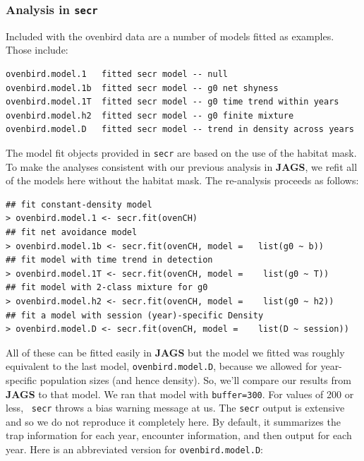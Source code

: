 \subsubsection{Analysis in \mbox{\tt secr} }


Included with the ovenbird data are a number of  models fitted as
examples. Those include:
{\small
\begin{verbatim}
ovenbird.model.1   fitted secr model -- null
ovenbird.model.1b  fitted secr model -- g0 net shyness
ovenbird.model.1T  fitted secr model -- g0 time trend within years
ovenbird.model.h2  fitted secr model -- g0 finite mixture
ovenbird.model.D   fitted secr model -- trend in density across years
\end{verbatim}
}
The model fit objects provided in \mbox{\tt secr} are based on the use
of the habitat mask.
To make the analyses consistent with our previous analysis in {\bf
  JAGS}, we 
refit all of the models here without the habitat mask.
The re-analysis proceeds as follows:
{\small
\begin{verbatim}
## fit constant-density model
> ovenbird.model.1 <- secr.fit(ovenCH)
## fit net avoidance model
> ovenbird.model.1b <- secr.fit(ovenCH, model =   list(g0 ~ b))
## fit model with time trend in detection
> ovenbird.model.1T <- secr.fit(ovenCH, model =    list(g0 ~ T))
## fit model with 2-class mixture for g0
> ovenbird.model.h2 <- secr.fit(ovenCH, model =    list(g0 ~ h2))
## fit a model with session (year)-specific Density
> ovenbird.model.D <- secr.fit(ovenCH, model =    list(D ~ session))
\end{verbatim}
}
All of these can be fitted easily in {\bf JAGS} but
the model we fitted was roughly equivalent to the last model,
\mbox{\tt ovenbird.model.D}, because we allowed for year-specific
population sizes (and hence density). So, we'll
compare our results from {\bf JAGS} to that
model.  We ran that model with \mbox{\tt buffer=300}. For values of
200 or less,  \mbox{\tt
  secr} throws a bias warning message at us.
The \mbox{\tt secr} 
output is extensive 
and so we
do not reproduce it completely here. By default, it summarizes the
trap information for each year, encounter information, and then output for
each year. Here is an abbreviated version for \mbox{\tt ovenbird.model.D}:
